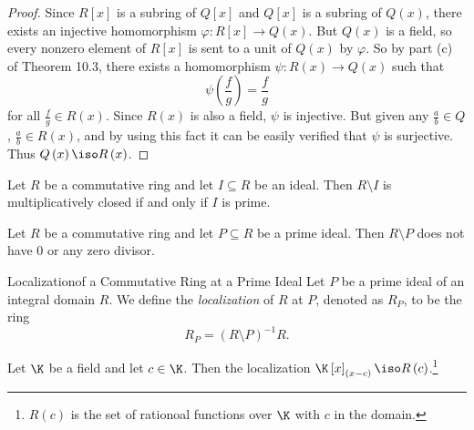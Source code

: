 \documentclass[pmath347]{subfiles}
\begin{document}
    \begin{proof}
        Since $R\left[ x \right]$ is a subring of $Q\left[ x \right]$ and $Q\left[ x \right]$ is a subring of $Q\left( x \right)$, there exists an injective homomorphism $\varphi:R\left[ x \right] \to Q\left( x \right)$. But $Q\left( x \right)$ is a field, so every nonzero element of $R\left[ x \right]$ is sent to a unit of $Q\left( x \right)$ by $\varphi$. So by part (c) of Theorem 10.3, there exists a homomorphism $\psi:R\left( x \right) \to Q\left( x \right)$ such that
        \begin{equation*}
            \psi\left( \frac{f}{g} \right) = \frac{f}{g}
        \end{equation*}
        for all $\frac{f}{g}\in R\left( x \right)$. Since $R\left( x \right)$ is also a field, $\psi$ is injective. But given any $\frac{a}{b}\in Q$, $\frac{a}{b}\in R\left( x \right)$, and by using this fact it can be easily verified that $\psi$ is surjective. Thus $Q\left( x \right)\iso R\left( x \right)$.
    \end{proof}

    \begin{prop}{}
        Let $R$ be a commutative ring and let $I\subseteq R$ be an ideal. Then $R\setminus I$ is multiplicatively closed if and only if $I$ is prime.
    \end{prop}

    \begin{prop}{}
        Let $R$ be a commutative ring and let $P\subseteq R$ be a prime ideal. Then $R\setminus P$ does not have $0$ or any zero divisor.
    \end{prop}

    \begin{definition}{Localization}{of a Commutative Ring at a Prime Ideal}
        Let $P$ be a prime ideal of an integral domain $R$. We define the \emph{localization} of $R$ at $P$, denoted as $R_P$, to be the ring
        \begin{equation*}
            R_P = \left( R\setminus P \right) ^{-1} R.
        \end{equation*}
    \end{definition}

    \begin{prop}{}
        Let $\K$ be a field and let $c\in\K$. Then the localization $\K\left[ x \right] _{\left( x-c \right) }\iso R\left( c \right)$.\footnote{$R\left( c \right)$ is the set of rationoal functions over $\K$ with $c$ in the domain.}
    \end{prop}
    
\end{document}
